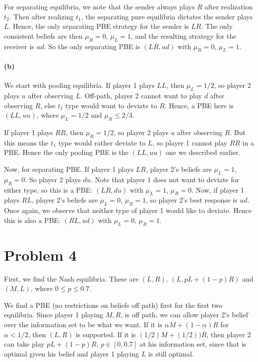 \documentclass[10pt,letter]{article}
\begin{document}
For separating equilibria, we note that the sender always plays $R$ after realization $t_2$. Then after realizing $t_1$, the separating pure equilibria dictates the sender plays $L$. Hence, the only separating PBE strategy for the sender is $LR$. The only consistent beliefs are then $\mu_R = 0$, $\mu_L = 1$, and the resulting strategy for the receiver is $ud$. So the only separating PBE is $(LR, ud)$ with $\mu_R = 0$, $\mu_L = 1$.

\paragraph*{(b)}
We start with pooling equilibria. If player 1 plays $LL$, then $\mu_L = 1/2$, so player 2 plays $u$ after observing $L$. Off-path, player 2 cannot want to play $d$ after observing $R$, else $t_1$ type would want to deviate to $R$. Hence, a PBE here is $(LL, uu)$, where $\mu_L = 1/2$ and $\mu_R \le 2/3$.

If player 1 plays $RR$, then $\mu_R = 1/2$, so player 2 plays $u$ after observing $R$. But this means the $t_1$ type would rather deviate to $L$, so player 1 cannot play $RR$ in a PBE. Hence the only pooling PBE is the $(LL, uu)$ one we described earlier.

Now, for separating PBE. If player 1 plays $LR$, player 2's beliefs are $\mu_L = 1$, $\mu_R = 0$. So player 2 plays $du$. Note that player 1 does not want to deviate for either type, so this is a PBE: $(LR, du)$ with $\mu_L = 1$, $\mu_R = 0$. Now, if player 1 plays $RL$, player 2's beliefs are $\mu_L= 0$, $\mu_R = 1$, so player 2's best response is $ud$. Once again, we observe that neither type of player 1 would like to deviate. Hence this is also a PBE: $(RL, ud)$ with $\mu_L = 0$, $\mu_R = 1$.

\section*{Problem 4}
First, we find the Nash equilibria. These are $(L,R)$, $(L, pL + (1-p)R)$ and $(M, L)$, where $0 \le p \le 0.7$.

We find a PBE (no restrictions on beliefs off path) first for the first two equilibria. Since player 1 playing $M,R$, is off path, we can allow player 2's belief over the information set to be what we want. If it is $\alpha M + (1-\alpha) R$ for $\alpha < 1/2$, then $(L,R)$ is supported. If it is $(1/2) M + (1/2))R$, then player 2 can take play $pL + (1-p)R$, $p \in [0, 0.7]$ at his information set, since that is optimal given his belief and player 1 playing $L$ is still optimal.
\end{document}
